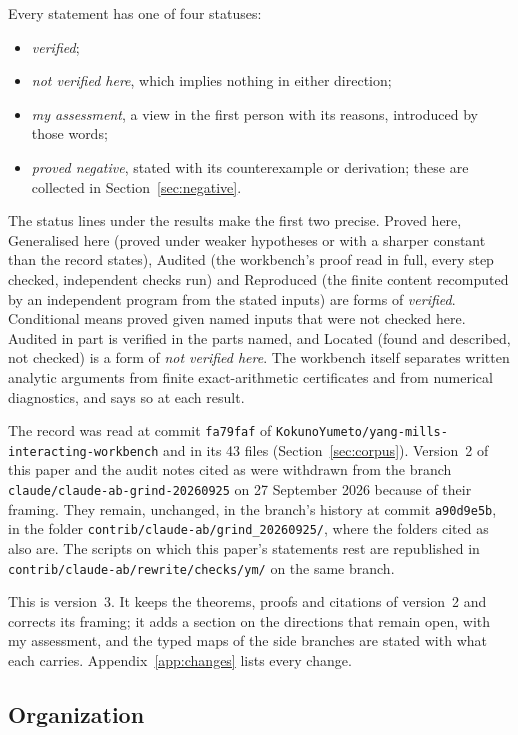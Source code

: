 Every statement has one of four statuses:
\begin{itemize}
\item \emph{verified};
\item \emph{not verified here}, which implies nothing in either direction;
\item \emph{my assessment}, a view in the first person with its reasons, introduced by those words;
\item \emph{proved negative}, stated with its counterexample or derivation; these are collected in Section~\ref{sec:negative}.
\end{itemize}
The status lines under the results make the first two precise. \textsf{Proved here}, \textsf{Generalised here} (proved under weaker hypotheses or with a sharper constant than the record states), \textsf{Audited} (the workbench's proof read in full, every step checked, independent checks run) and \textsf{Reproduced} (the finite content recomputed by an independent program from the stated inputs) are forms of \emph{verified}. \textsf{Conditional} means proved given named inputs that were not checked here. \textsf{Audited in part} is verified in the parts named, and \textsf{Located} (found and described, not checked) is a form of \emph{not verified here}. The workbench itself separates written analytic arguments from finite exact-arithmetic certificates and from numerical diagnostics, and says so at each result.

The record was read at commit \texttt{fa79faf} of \texttt{KokunoYumeto/yang-mills-interacting-workbench} and in its 43 files (Section~\ref{sec:corpus}). Version~2 of this paper and the audit notes cited as  were withdrawn from the branch \texttt{claude/claude-ab-grind-20260925} on 27 September 2026 because of their framing. They remain, unchanged, in the branch's history at commit \texttt{a90d9e5b}, in the folder \texttt{contrib/claude-ab/grind\_20260925/}, where the folders cited as  also are. The scripts on which this paper's statements rest are republished in \texttt{contrib/claude-ab/rewrite/checks/ym/} on the same branch.

This is version~3. It keeps the theorems, proofs and citations of version~2 and corrects its framing; it adds a section on the directions that remain open, with my assessment, and the typed maps of the side branches are stated with what each carries. Appendix~\ref{app:changes} lists every change.

\subsection*{Organization}

